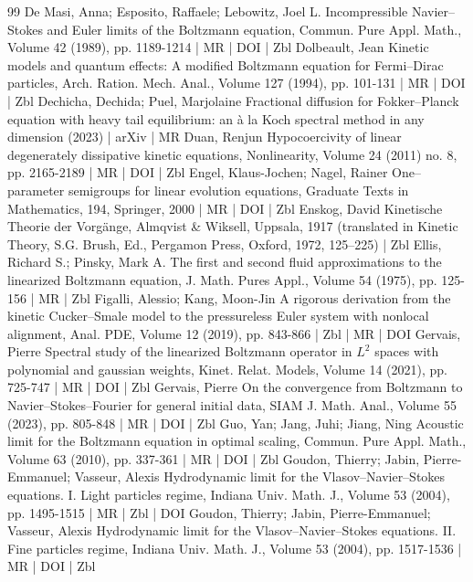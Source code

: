 \begin{thebibliography}{99}
 De Masi, Anna; Esposito, Raffaele; Lebowitz, Joel L. Incompressible Navier–Stokes and Euler limits of the Boltzmann equation, Commun. Pure Appl. Math., Volume 42 (1989), pp. 1189-1214 | MR | DOI | Zbl
 Dolbeault, Jean Kinetic models and quantum effects: A modified Boltzmann equation for Fermi–Dirac particles, Arch. Ration. Mech. Anal., Volume 127 (1994), pp. 101-131 | MR | DOI | Zbl
 Dechicha, Dechida; Puel, Marjolaine Fractional diffusion for Fokker–Planck equation with heavy tail equilibrium: an à la Koch spectral method in any dimension (2023) | arXiv | MR
 Duan, Renjun Hypocoercivity of linear degenerately dissipative kinetic equations, Nonlinearity, Volume 24 (2011) no. 8, pp. 2165-2189 | MR | DOI | Zbl
 Engel, Klaus-Jochen; Nagel, Rainer One–parameter semigroups for linear evolution equations, Graduate Texts in Mathematics, 194, Springer, 2000 | MR | DOI | Zbl
 Enskog, David Kinetische Theorie der Vorgänge, Almqvist \& Wiksell, Uppsala, 1917 (translated in Kinetic Theory, S.G. Brush, Ed., Pergamon Press, Oxford, 1972, 125–225) | Zbl
 Ellis, Richard S.; Pinsky, Mark A. The first and second fluid approximations to the linearized Boltzmann equation, J. Math. Pures Appl., Volume 54 (1975), pp. 125-156 | MR | Zbl
 Figalli, Alessio; Kang, Moon-Jin A rigorous derivation from the kinetic Cucker–Smale model to the pressureless Euler system with nonlocal alignment, Anal. PDE, Volume 12 (2019), pp. 843-866 | Zbl | MR | DOI
 Gervais, Pierre Spectral study of the linearized Boltzmann operator in ${L}^2$ spaces with polynomial and gaussian weights, Kinet. Relat. Models, Volume 14 (2021), pp. 725-747 | MR | DOI | Zbl
 Gervais, Pierre On the convergence from Boltzmann to Navier–Stokes–Fourier for general initial data, SIAM J. Math. Anal., Volume 55 (2023), pp. 805-848 | MR | DOI | Zbl
 Guo, Yan; Jang, Juhi; Jiang, Ning Acoustic limit for the Boltzmann equation in optimal scaling, Commun. Pure Appl. Math., Volume 63 (2010), pp. 337-361 | MR | DOI | Zbl
 Goudon, Thierry; Jabin, Pierre-Emmanuel; Vasseur, Alexis Hydrodynamic limit for the Vlasov–Navier–Stokes equations. I. Light particles regime, Indiana Univ. Math. J., Volume 53 (2004), pp. 1495-1515 | MR | Zbl | DOI
 Goudon, Thierry; Jabin, Pierre-Emmanuel; Vasseur, Alexis Hydrodynamic limit for the Vlasov–Navier–Stokes equations. II. Fine particles regime, Indiana Univ. Math. J., Volume 53 (2004), pp. 1517-1536 | MR | DOI | Zbl

\end{thebibliography}
